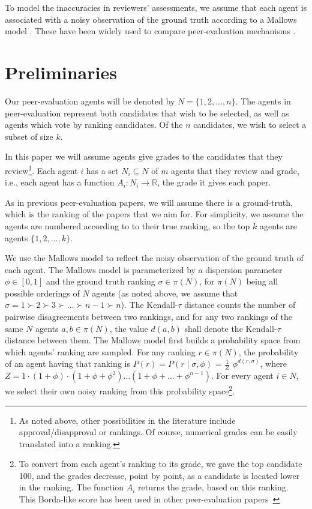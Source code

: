 \documentclass[letterpaper]{article}
\begin{document}
To model the inaccuracies in reviewers’ assessments, we assume that each agent is associated with a noisy observation of the ground truth according to a Mallows model \cite{Mal57}. These have been widely used to compare peer-evaluation mechanisms \cite{ALMRW16,ALMRW19,MTZ20,LMTZ23}.

\section{Preliminaries}\label{prelim}

Our peer-evaluation agents will be denoted by $N=\{1,2,\ldots,n\}$. The agents in peer-evaluation represent both candidates that wish to be selected, as well as agents which vote by ranking candidates. Of the $n$ candidates, we wish to select a subset of size $k$.

In this paper we will assume agents give grades to the candidates that they review\footnote{As noted above, other possibilities in the literature include approval/disapproval or rankings. Of course, numerical grades can be easily translated into a ranking.}. Each agent $i$ has a set $N_{i}\subseteq N$ of $m$ agents that they review and grade, i.e., each agent has a function $A_{i}:N_{i}\rightarrow \mathbb{R}$, the grade it gives each paper.

As in previous peer-evaluation papers, we will assume there is a ground-truth, which is the ranking of the papers that we aim for. For simplicity, we assume the agents are numbered according to to their true ranking, so the top $k$ agents are agents $\{1,2,\ldots,k\}$.

We use the Mallows model to reflect the noisy observation of the ground truth of each agent. The Mallows model is parameterized by a dispersion parameter $\phi\in [0,1]$ and the ground truth ranking $\sigma\in\pi(N)$, for $\pi(N)$ being all possible orderings of $N$ agents (as noted above, we assume that $\sigma=1\succ 2\succ 3\succ\ldots\succ n-1\succ n$). The Kendall-$\tau$ distance counts the number of pairwise disagreements between two rankings, and for any two rankings of the same $N$ agents $a,b\in\pi(N)$, the value $d(a,b)$ shall denote the Kendall-$\tau$ distance between them. The Mallows model first builds a probability space from which agents' ranking are sampled. For any ranking $r\in\pi(N)$, the probability of an agent having that ranking is $P(r) = P(r \mid \sigma,\phi)$ = $\frac{1}{Z}$ $\phi^{d(r,\sigma)}$, where $Z = 1\cdot(1+\phi)\cdot(1+\phi+\phi^2) \ldots (1+ \phi+ \ldots +\phi^{n-1})$. For every agent $i\in N$, we select their own noisy ranking from this probability space\footnote{To convert from each agent's ranking to its grade, we gave the top candidate 100, and the grades decrease, point by point, as a candidate is located lower in the ranking. The function $A_{i}$ returns the grade, based on this ranking. This Borda-like score has been used in other peer-evaluation papers~\cite{ALMRW16,ALMRW19}}.
\end{document}
